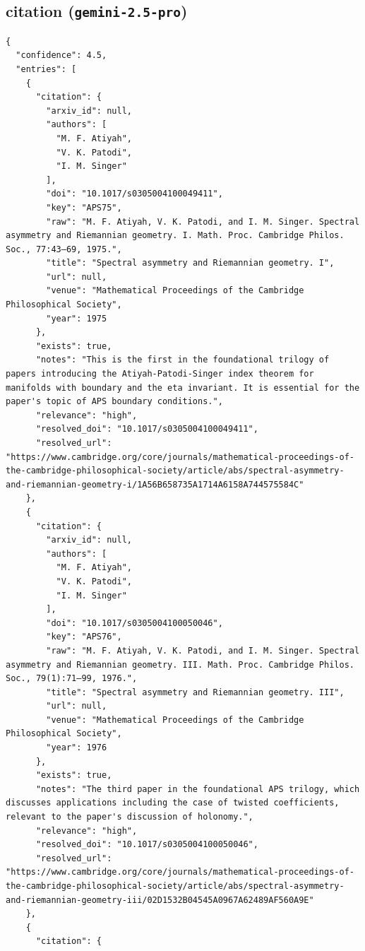 \documentclass[11pt]{article}
\begin{document}
\subsection*{citation (\texttt{gemini-2.5-pro})}
\begin{verbatim}
{
  "confidence": 4.5,
  "entries": [
    {
      "citation": {
        "arxiv_id": null,
        "authors": [
          "M. F. Atiyah",
          "V. K. Patodi",
          "I. M. Singer"
        ],
        "doi": "10.1017/s0305004100049411",
        "key": "APS75",
        "raw": "M. F. Atiyah, V. K. Patodi, and I. M. Singer. Spectral asymmetry and Riemannian geometry. I. Math. Proc. Cambridge Philos. Soc., 77:43–69, 1975.",
        "title": "Spectral asymmetry and Riemannian geometry. I",
        "url": null,
        "venue": "Mathematical Proceedings of the Cambridge Philosophical Society",
        "year": 1975
      },
      "exists": true,
      "notes": "This is the first in the foundational trilogy of papers introducing the Atiyah-Patodi-Singer index theorem for manifolds with boundary and the eta invariant. It is essential for the paper's topic of APS boundary conditions.",
      "relevance": "high",
      "resolved_doi": "10.1017/s0305004100049411",
      "resolved_url": "https://www.cambridge.org/core/journals/mathematical-proceedings-of-the-cambridge-philosophical-society/article/abs/spectral-asymmetry-and-riemannian-geometry-i/1A56B658735A1714A6158A744575584C"
    },
    {
      "citation": {
        "arxiv_id": null,
        "authors": [
          "M. F. Atiyah",
          "V. K. Patodi",
          "I. M. Singer"
        ],
        "doi": "10.1017/s0305004100050046",
        "key": "APS76",
        "raw": "M. F. Atiyah, V. K. Patodi, and I. M. Singer. Spectral asymmetry and Riemannian geometry. III. Math. Proc. Cambridge Philos. Soc., 79(1):71–99, 1976.",
        "title": "Spectral asymmetry and Riemannian geometry. III",
        "url": null,
        "venue": "Mathematical Proceedings of the Cambridge Philosophical Society",
        "year": 1976
      },
      "exists": true,
      "notes": "The third paper in the foundational APS trilogy, which discusses applications including the case of twisted coefficients, relevant to the paper's discussion of holonomy.",
      "relevance": "high",
      "resolved_doi": "10.1017/s0305004100050046",
      "resolved_url": "https://www.cambridge.org/core/journals/mathematical-proceedings-of-the-cambridge-philosophical-society/article/abs/spectral-asymmetry-and-riemannian-geometry-iii/02D1532B04545A0967A62489AF560A9E"
    },
    {
      "citation": {

\end{verbatim}
\end{document}
